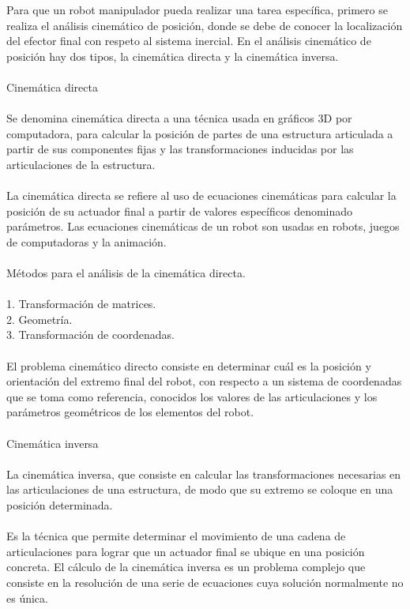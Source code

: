 \documentclass[12pt,a4paper]{article}
\begin{document}
Para que un robot manipulador pueda realizar una tarea específica, primero se realiza el análisis cinemático de posición, donde se debe de conocer la localización del efector final con respeto al sistema inercial. En el análisis cinemático de posición hay dos tipos, la cinemática directa y la cinemática inversa.\\
\\
Cinemática directa \\
\\
Se denomina cinemática directa a una técnica usada en gráficos 3D por computadora, para calcular la posición de partes de una estructura articulada a partir de sus componentes fijas y las transformaciones inducidas por las articulaciones de la estructura.\\
\\
La cinemática directa se refiere al uso de ecuaciones cinemáticas para calcular la posición de su actuador final a partir de valores específicos denominado parámetros. Las ecuaciones cinemáticas de un robot son usadas en robots, juegos de computadoras y la animación.\\
\\
Métodos para el análisis de la cinemática directa.\\
\\
1.	Transformación de matrices.\\
2.	Geometría.\\
3.	Transformación de coordenadas.\\
\\
El problema cinemático directo consiste en determinar cuál es la posición y orientación del extremo final del robot, con respecto a un sistema de coordenadas que se toma como referencia, conocidos los valores de las articulaciones y los parámetros geométricos de los elementos del robot.\\
\\
Cinemática inversa\\
\\
 La cinemática inversa, que consiste en calcular las transformaciones necesarias en las articulaciones de una estructura, de modo que su extremo se coloque en una posición determinada.\\
 \\
 Es la técnica que permite determinar el movimiento de una cadena de articulaciones para lograr que un actuador final se ubique en una posición concreta. El cálculo de la cinemática inversa es un problema complejo que consiste en la resolución de una serie de ecuaciones cuya solución normalmente no es única.\\
\end{document}
